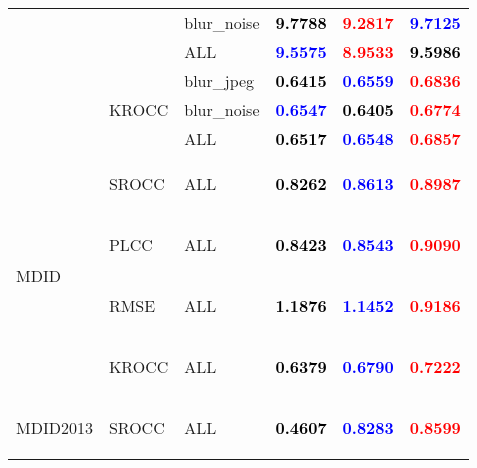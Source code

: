 \documentclass{article}
\begin{document}
\begin{table}
\begin{tabular}{||l|l|l||ccc||}
\cmidrule{3-6}
&&blur_noise&\textbf{\textcolor{black}{9.7788}}&\textbf{\textcolor{red}{9.2817}}&\textbf{\textcolor{blue}{9.7125}}\\
\cmidrule{3-6}
&&ALL&\textbf{\textcolor{blue}{9.5575}}&\textbf{\textcolor{red}{8.9533}}&\textbf{\textcolor{black}{9.5986}}\\
\cmidrule{2-6}\cmidrule{2-6}
&\multirow{3}{*}{\begin{turn}{-90}KROCC\end{turn}}&blur_jpeg&\textbf{\textcolor{black}{0.6415}}&\textbf{\textcolor{blue}{0.6559}}&\textbf{\textcolor{red}{0.6836}}\\
\cmidrule{3-6}
&&blur_noise&\textbf{\textcolor{blue}{0.6547}}&\textbf{\textcolor{black}{0.6405}}&\textbf{\textcolor{red}{0.6774}}\\
\cmidrule{3-6}
&&ALL&\textbf{\textcolor{black}{0.6517}}&\textbf{\textcolor{blue}{0.6548}}&\textbf{\textcolor{red}{0.6857}}\\
\midrule\midrule
\multirow{4}{*}{\begin{turn}{-90}MDID\end{turn}}&\multirow{1}{*}{\begin{turn}{-90}SROCC\end{turn}}&ALL&\textbf{\textcolor{black}{0.8262}}&\textbf{\textcolor{blue}{0.8613}}&\textbf{\textcolor{red}{0.8987}}\\
\cmidrule{2-6}\cmidrule{2-6}
&\multirow{1}{*}{\begin{turn}{-90}PLCC\end{turn}}&ALL&\textbf{\textcolor{black}{0.8423}}&\textbf{\textcolor{blue}{0.8543}}&\textbf{\textcolor{red}{0.9090}}\\
\cmidrule{2-6}\cmidrule{2-6}
&\multirow{1}{*}{\begin{turn}{-90}RMSE\end{turn}}&ALL&\textbf{\textcolor{black}{1.1876}}&\textbf{\textcolor{blue}{1.1452}}&\textbf{\textcolor{red}{0.9186}}\\
\cmidrule{2-6}\cmidrule{2-6}
&\multirow{1}{*}{\begin{turn}{-90}KROCC\end{turn}}&ALL&\textbf{\textcolor{black}{0.6379}}&\textbf{\textcolor{blue}{0.6790}}&\textbf{\textcolor{red}{0.7222}}\\
\midrule\midrule
\multirow{4}{*}{\begin{turn}{-90}MDID2013\end{turn}}&\multirow{1}{*}{\begin{turn}{-90}SROCC\end{turn}}&ALL&\textbf{\textcolor{black}{0.4607}}&\textbf{\textcolor{blue}{0.8283}}&\textbf{\textcolor{red}{0.8599}}\\

\end{tabular}
\end{table}
\end{document}
